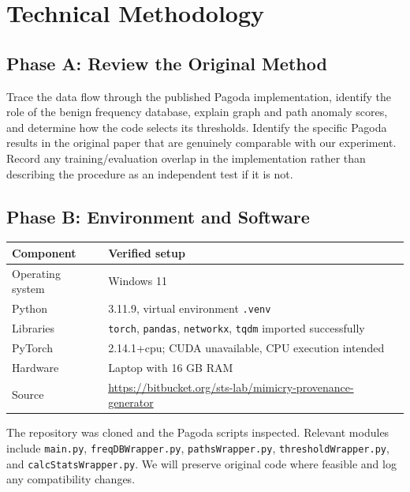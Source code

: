 \documentclass[11pt,letterpaper]{article}
\begin{document}
\section{Technical Methodology}
\subsection{Phase A: Review the Original Method}
Trace the data flow through the published Pagoda implementation, identify the role of the benign frequency database, explain graph and path anomaly scores, and determine how the code selects its thresholds. Identify the specific Pagoda results in the original paper that are genuinely comparable with our experiment. Record any training/evaluation overlap in the implementation rather than describing the procedure as an independent test if it is not.

\subsection{Phase B: Environment and Software}
\begin{tabularx}{\linewidth}{@{}lX@{}}
\toprule
\textbf{Component} & \textbf{Verified setup}\\\midrule
Operating system & Windows 11\\
Python & 3.11.9, virtual environment \texttt{.venv}\\
Libraries & \texttt{torch}, \texttt{pandas}, \texttt{networkx}, \texttt{tqdm} imported successfully\\
PyTorch & 2.14.1+cpu; CUDA unavailable, CPU execution intended\\
Hardware & Laptop with 16 GB RAM\\
Source & \url{https://bitbucket.org/sts-lab/mimicry-provenance-generator}\\\bottomrule
\end{tabularx}

The repository was cloned and the Pagoda scripts inspected. Relevant modules include \texttt{main.py}, \texttt{freqDBWrapper.py}, \texttt{pathsWrapper.py}, \texttt{thresholdWrapper.py}, and \texttt{calcStatsWrapper.py}. We will preserve original code where feasible and log any compatibility changes.
\end{document}
